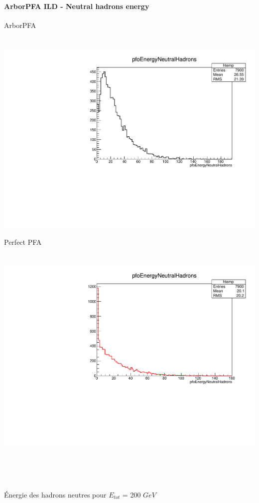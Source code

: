 \documentclass[8pt]{beamer}
\begin{document}
  \begin{frame}
  \frametitle{\backup}
  \framesubtitle{ArborPFA ILD - Neutral hadrons energy}
    \begin{minipage}{0.48\linewidth}
      \begin{center}
        ArborPFA \\
        ~ \\
        ~~~~~\includegraphics[width=\linewidth]{pfoEnergyNeutralHadrons_ArborPFA.pdf}
      \end{center}
    \end{minipage}
    \begin{minipage}{0.48\linewidth}
      \begin{center}
        Perfect PFA \\
        ~ \\
        ~~~~~\includegraphics[width=\linewidth]{pfoEnergyNeutralHadrons_PerfectPFA.pdf}
      \end{center}
    \end{minipage}
    ~ \\
    ~ \\
    ~ \\
    \begin{center} Énergie des hadrons neutres pour $E_{tot}$ = 200 $GeV$ \end{center}
  \end{frame}
\end{document}
